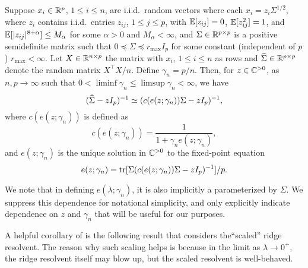 \documentclass{article}
\begin{document}
\begin{lemma}
    \label{lem:basic-ridge-resolvent-deterministic-equivalent}
    Suppose $x_i \in \mathbb{R}^{p}$, $1 \le i \le n$, are i.i.d.\ random vectors
    where each $x_i = z_i \Sigma^{1/2}$,
    where $z_i$ contains i.i.d.\ entries $z_{ij}$, $1 \le j \le p$,
    with $\mathbb{E}[z_{ij}] = 0$, $\mathbb{E}[z_{ij}^2] = 1$, and $\mathbb{E}[|z_{ij}|^{8+\alpha}] \le M_\alpha$
    for some $\alpha > 0$ and $M_\alpha < \infty$,
    and $\Sigma \in \mathbb{R}^{p \times p}$ is a positive semidefinite matrix
    such that $0 \preceq \Sigma \preceq r_{\max} I_p$
    for some constant
    (independent of $p$)
    $r_{\max} < \infty$.
    Let $X \in \mathbb{R}^{n \times p}$ the matrix with $x_i$, $1 \le i \le n$ as rows
    and ${\widehat{\Sigma}} \in \mathbb{R}^{p \times p}$ denote the random matrix $X^\top X / n$.
    Define $\gamma_n = p / n$.
    Then, 
    for $z \in \mathbb{C}^{> 0}$,
    as $n, p \to \infty$ such that $0 < \liminf \gamma_n \le \limsup \gamma_n < \infty$,
    we have
    \begin{equation}
        ({\widehat{\Sigma}} - z I_p)^{-1}
        \simeq
        (c(e(z; \gamma_n)) \Sigma - z I_p)^{-1},
    \end{equation}
    where
    $c(e(z; \gamma_n))$ is defined as
    \begin{equation}
        \label{eq:basic-ridge-equivalence-c-e-relation}
        c(e(z; \gamma_n))
        = \frac{1}{ 1 + \gamma_n e(z; \gamma_n)},
    \end{equation}
    and $e(z; \gamma_n)$ is the unique solution in $\mathbb{C}^{> 0}$ to the fixed-point equation
    \begin{equation}
        \label{eq:basic-ridge-equivalence-e-fixed-point}
        e(z; \gamma_n)
        = 
        \operatorname{tr}[ \Sigma (c(e(z; \gamma_n)) \Sigma  - z I_p)^{-1} ] / p.
    \end{equation}
\end{lemma}

We note that in defining $e(\lambda; \gamma_n)$,
it is also implicitly a parameterized by $\Sigma$.
We suppress this dependence for notational simplicity,
and only explicitly indicate dependence on 
$z$
and $\gamma_n$
that will be useful for our purposes. 

A helpful corollary of 
is the following result that considers the``scaled'' ridge resolvent.
The reason why such scaling helps is because
in the limit as $\lambda \to 0^+$,
the ridge resolvent itself may blow up,
but the scaled resolvent is well-behaved.
\end{document}
